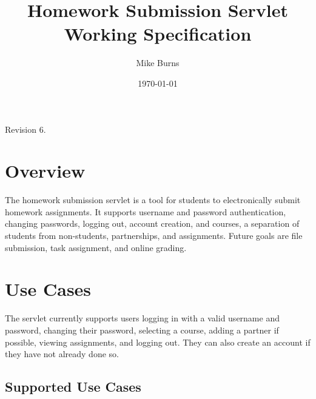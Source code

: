 \documentclass[a4paper]{article}
\begin{document}
\title{Homework Submission Servlet Working Specification}
\author{Mike Burns}
\date{\today}

\maketitle

Revision 6.

\section{Overview}\label{sec:overview}

The homework submission servlet is a tool for students to electronically submit
homework assignments. It supports username and password authentication,
changing passwords, logging out, account creation, and courses, a separation of
students from non-students, partnerships, and assignments. Future goals are
file submission, task assignment, and online grading.

\section{Use Cases}\label{sec:usecases}

The servlet currently supports users logging in with a valid username and
password, changing their password, selecting a course, adding a partner if
possible, viewing assignments, and logging out. They can also create an account
if they have not already done so.

\subsection{Supported Use Cases}\label{subsec:detailed-usecases}
\end{document}
